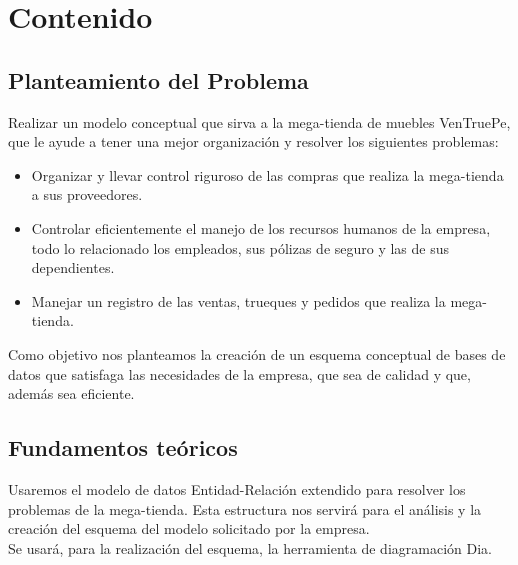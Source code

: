 \documentclass{article}
\begin{document}
   

\clearpage

\section{Contenido}

\subsection{Planteamiento del Problema}

Realizar un modelo conceptual que sirva a la mega-tienda de muebles VenTruePe, que le ayude a tener una mejor organizaci\'on y resolver los siguientes problemas:
\begin{itemize}
\item Organizar y llevar control riguroso de las compras que realiza la mega-tienda a sus proveedores. 
\item Controlar eficientemente el manejo de los recursos humanos de la empresa, todo lo relacionado los empleados, sus p\'olizas de seguro y las de sus dependientes.
\item Manejar un registro de las ventas, trueques y pedidos que realiza la mega-tienda.

\end{itemize}
 Como objetivo nos planteamos la creaci\'on de un esquema conceptual de bases de datos que satisfaga las necesidades de la empresa, que sea de calidad y que, adem\'as sea eficiente.
\subsection{Fundamentos te\'oricos}
Usaremos el modelo de datos Entidad-Relaci\'on extendido para resolver los problemas de la mega-tienda. Esta estructura nos servir\'a para el an\'alisis y la creaci\'on del esquema del modelo solicitado por la empresa.
\\

Se usar\'a, para la realizaci\'on del esquema, la herramienta de diagramaci\'on Dia.

\end{document}
